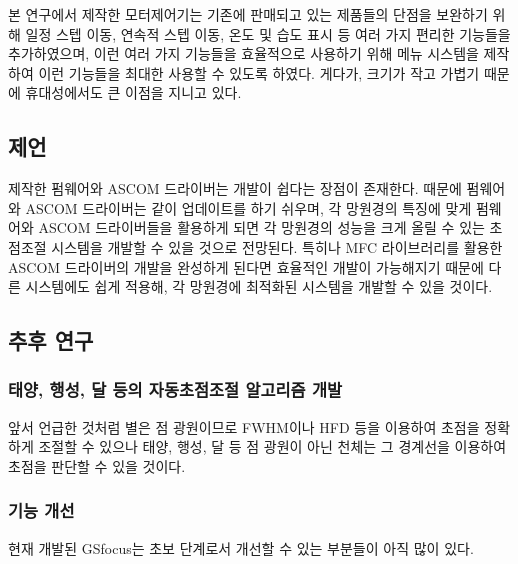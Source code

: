 본 연구에서 제작한 모터제어기는 기존에 판매되고 있는 제품들의 단점을 보완하기 위해 일정 스텝 이동, 연속적 스텝 이동, 온도 및 습도 표시 등 여러 가지 편리한 기능들을 추가하였으며, 이런 여러 가지 기능들을 효율적으로 사용하기 위해 메뉴 시스템을 제작하여 이런 기능들을 최대한 사용할 수 있도록 하였다. 게다가, 크기가 작고 가볍기 때문에 휴대성에서도 큰 이점을 지니고 있다.

\subsection{제언}
제작한 펌웨어와 ASCOM 드라이버는 개발이 쉽다는 장점이 존재한다. 때문에 펌웨어와 ASCOM 드라이버는 같이 업데이트를 하기 쉬우며, 각 망원경의 특징에 맞게 펌웨어와 ASCOM 드라이버들을 활용하게 되면 각 망원경의 성능을 크게 올릴 수 있는 초점조절 시스템을 개발할 수 있을 것으로 전망된다.
특히나 MFC 라이브러리를 활용한 ASCOM 드라이버의 개발을 완성하게 된다면 효율적인 개발이 가능해지기 때문에 다른 시스템에도 쉽게 적용해, 각 망원경에 최적화된 시스템을 개발할 수 있을 것이다.


\subsection{추후 연구}


\subsubsection{태양, 행성, 달 등의 자동초점조절 알고리즘 개발}

앞서 언급한 것처럼 별은 점 광원이므로 FWHM이나 HFD 등을 이용하여 초점을 정확하게 조절할 수 있으나 태양, 행성, 달 등 점 광원이 아닌 천체는 그 경계선을 이용하여 초점을 판단할 수 있을 것이다. 


\subsubsection{기능 개선}

현재 개발된 GSfocus는 초보 단계로서 개선할 수 있는 부분들이 아직 많이 있다. 

